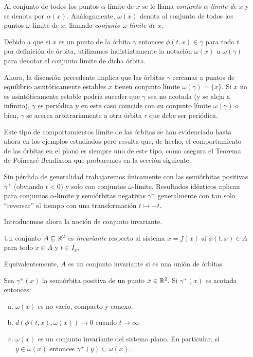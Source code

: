 Al conjunto de todos los puntos $\alpha$-límite de $x$ se le llama \emph{conjunto $\alpha$-límite de $x$} y se denota por $\alpha(x)$. Análogamente, $\omega(x)$ denota al conjunto de todos los puntos $\omega$-límite de $x$, llamado \emph{conjunto $\omega$-límite de $x$}.

Debido a que si $x$ es un punto de la órbita $\gamma$ entonces $\phi(t,x) \in \gamma$ para todo $t$ por definición de órbita, utilizamos indistintamente la notación $\omega(x)$ u $\omega(\gamma)$ para denotar el conjunto límite de dicha órbita.

Ahora, la discusión precedente implica que las órbitas $\gamma$ cercanas a puntos de equilibrio asintóticamente estables $\bar{x}$ tienen conjunto límite $\omega(\gamma) = \{\bar{x}\}$. Si $\bar{x}$ no es asintóticamente estable podría suceder que $\gamma$ sea no acotada (y se aleja a infinito), $\gamma$ es periódica y en este caso coincide con su conjunto límite $\omega(\gamma)$ o bien, $\gamma$ se acerca arbitrariamente a otra órbita $\tau$ que debe ser periódica.

Este tipo de comportamientos límite de las órbitas se han evidenciado hasta ahora en los ejemplos estudiados pero resulta que, de hecho, el comportamiento de las órbitas en el plano es siempre uno de este tipo, como asegura el Teorema de Poincaré-Bendixson que probaremos en la sección siguiente.

Sin pérdida de generalidad trabajaremos únicamente con las semiórbitas positivas $\gamma^+$ (obviando $t < 0$) y solo con conjuntos $\omega$-límite. Resultados idénticos aplican para conjuntos $\alpha$-límite y semiórbitas negativas $\gamma^-$ generalmente con tan solo ``reversar'' el tiempo con una transformación $t \mapsto -t$.

Introducimos ahora la noción de conjunto invariante.

\begin{definition} \label{def:conjuntoinvariante}
Un conjunto $A \subseteq {\ensuremath{\mathbb{R}}}^2$ es \emph{invariante} respecto al sistema $\dot{x} = f(x)$ si $\phi(t,x) \in A$ para todo $x \in A$ y $t \in I_x$.
\end{definition}

Equivalentemente, $A$ es un conjunto invariante si es una unión de órbitas.


\begin{lemma} \label{lem:orbitaslimite}
Sea $\gamma^+(x)$ la semiórbita positiva de un punto $x \in {\ensuremath{\mathbb{R}}}^2$. Si $\gamma^+(x)$ es acotada entonces:

	\begin{enumerate}[(a)]
		\item $\omega(x)$ es no vacío, compacto y conexo.
		\item $d(\phi(t,x), \omega(x)) \to 0$ cuando $t \to \infty$.
		\item $\omega(x)$ es un conjunto invariante del sistema plano. En particular, si $y \in \omega(x)$ entonces $\gamma^+(y) \subseteq \omega(x)$.
	\end{enumerate}
\end{lemma}

